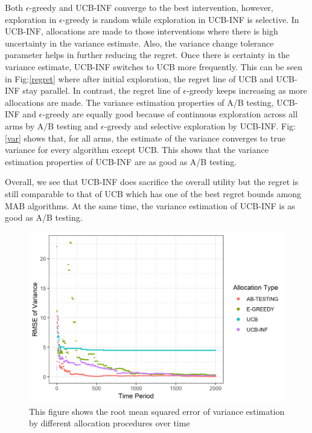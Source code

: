 \documentclass[12pt, letterpaper]{article}
\begin{document}
Both $\epsilon$-greedy and UCB-INF converge to the best intervention, however, exploration in $\epsilon$-greedy is random while exploration in UCB-INF is selective. In UCB-INF, allocations are made to those interventions where there is high uncertainty in the variance estimate. Also, the variance change tolerance parameter helps in further reducing the regret. Once there is certainty in the variance estimate, UCB-INF switches to UCB more frequently. This can be seen in Fig:\ref{regret} where after initial exploration, the regret line of UCB and UCB-INF stay parallel. In contrast, the regret line of $\epsilon$-greedy keeps increasing as more allocations are made. The variance estimation properties of A/B testing, UCB-INF and $\epsilon$-greedy are equally good because of continuous exploration across all arms by A/B testing and $\epsilon$-greedy and selective exploration by UCB-INF. Fig:\ref{var} shows that, for all arms, the estimate of the variance converges to true variance for every algorithm except UCB. This shows that the variance estimation properties of UCB-INF are as good as A/B testing.

Overall, we see that UCB-INF does sacrifice the overall utility but the regret is still comparable to that of UCB which has one of the best regret bounds among MAB algorithms. At the same time, the variance estimation of UCB-INF is as good as A/B testing. 



\begin{figure}
  \centering
    \includegraphics[width=\textwidth]{figs/var_rmse.png}
      \caption{This figure shows the root mean squared error of variance estimation by different allocation procedures over time}
      \label{var_rmse}
\end{figure}
\end{document}
